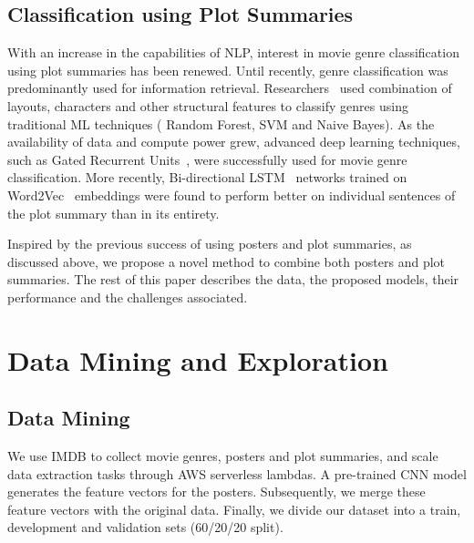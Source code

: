 \documentclass[10pt]{article}
\begin{document}
\subsection{Classification using Plot Summaries}
With an increase in the capabilities of NLP, interest in movie genre classification using plot summaries has been renewed. Until recently, genre classification was predominantly used for information retrieval. Researchers~\cite{Goldstein2007} used combination of layouts, characters and other structural features to classify genres using traditional ML techniques ( Random Forest, SVM and Naive Bayes). As the availability of data and compute power grew, advanced deep learning techniques, such as Gated Recurrent Units~\cite{hoang2018predicting}, were successfully used for movie genre classification. More recently, Bi-directional LSTM~\cite{Ertugrul2018} networks trained on Word2Vec~\cite{mikolov2013efficient} embeddings were found to perform better on individual sentences of the plot summary than in its entirety.

Inspired by the previous success of using posters and plot summaries, as discussed above, we propose a novel method to combine both posters and plot summaries. The rest of this paper describes the data, the proposed models, their performance and the challenges associated.

\section{Data Mining and Exploration}

\subsection{Data Mining}
We use IMDB to collect movie genres, posters and plot summaries, and scale data extraction tasks through AWS serverless lambdas. A pre-trained CNN model generates the feature vectors for the posters. Subsequently, we merge these feature vectors with the original data. Finally, we divide our dataset into a train, development and validation sets (60/20/20 split).

\end{document}
